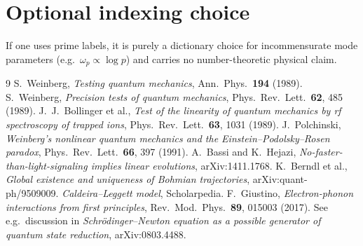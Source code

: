 \documentclass[11pt]{article}
\begin{document}
\section{Optional indexing choice}
If one uses prime labels, it is purely a dictionary choice for incommensurate mode parameters
(e.g.\ $\omega_{p}\propto\log p$) and carries no number-theoretic physical claim.


\begin{thebibliography}{9}
 S.~Weinberg, \emph{Testing quantum mechanics}, Ann.\ Phys.\ \textbf{194} (1989).
 S.~Weinberg, \emph{Precision tests of quantum mechanics}, Phys.\ Rev.\ Lett.\ \textbf{62}, 485 (1989).
 J.~J.~Bollinger et al., \emph{Test of the linearity of quantum mechanics by rf spectroscopy of trapped ions}, Phys.\ Rev.\ Lett.\ \textbf{63}, 1031 (1989).
 J.~Polchinski, \emph{Weinberg's nonlinear quantum mechanics and the Einstein--Podolsky--Rosen paradox}, Phys.\ Rev.\ Lett.\ \textbf{66}, 397 (1991).
 A.~Bassi and K.~Hejazi, \emph{No-faster-than-light-signaling implies linear evolutions}, arXiv:1411.1768.
 K.~Berndl et al., \emph{Global existence and uniqueness of Bohmian trajectories}, arXiv:quant-ph/9509009.
 \emph{Caldeira--Leggett model}, Scholarpedia.
 F.~Giustino, \emph{Electron-phonon interactions from first principles}, Rev.\ Mod.\ Phys.\ \textbf{89}, 015003 (2017).
 See e.g.\ discussion in \emph{Schr\"odinger--Newton equation as a possible generator of quantum state reduction}, arXiv:0803.4488.
\end{thebibliography}
\end{document}
